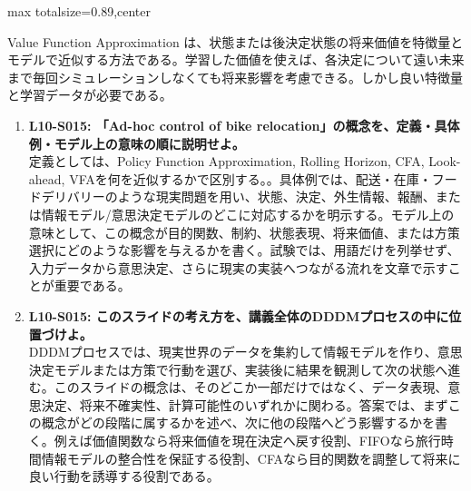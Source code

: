 \begin{minipage}[t]{0.58\textwidth}
\begin{adjustbox}{max totalsize={\textwidth}{0.89\textheight},center}
\begin{minipage}{\textwidth}
Value Function Approximation は、状態または後決定状態の将来価値を特徴量とモデルで近似する方法である。学習した価値を使えば、各決定について遠い未来まで毎回シミュレーションしなくても将来影響を考慮できる。しかし良い特徴量と学習データが必要である。\par{}\begin{enumerate}\item \textbf{L10-S015: 「Ad-hoc control of bike relocation」の概念を、定義・具体例・モデル上の意味の順に説明せよ。}\\定義としては、Policy Function Approximation, Rolling Horizon, CFA, Look-ahead, VFAを何を近似するかで区別する。。具体例では、配送・在庫・フードデリバリーのような現実問題を用い、状態、決定、外生情報、報酬、または情報モデル/意思決定モデルのどこに対応するかを明示する。モデル上の意味として、この概念が目的関数、制約、状態表現、将来価値、または方策選択にどのような影響を与えるかを書く。試験では、用語だけを列挙せず、入力データから意思決定、さらに現実の実装へつながる流れを文章で示すことが重要である。\item \textbf{L10-S015: このスライドの考え方を、講義全体のDDDMプロセスの中に位置づけよ。}\\DDDMプロセスでは、現実世界のデータを集約して情報モデルを作り、意思決定モデルまたは方策で行動を選び、実装後に結果を観測して次の状態へ進む。このスライドの概念は、そのどこか一部だけではなく、データ表現、意思決定、将来不確実性、計算可能性のいずれかに関わる。答案では、まずこの概念がどの段階に属するかを述べ、次に他の段階へどう影響するかを書く。例えば価値関数なら将来価値を現在決定へ戻す役割、FIFOなら旅行時間情報モデルの整合性を保証する役割、CFAなら目的関数を調整して将来に良い行動を誘導する役割である。\end{enumerate}
\end{minipage}
\end{adjustbox}
\end{minipage}


